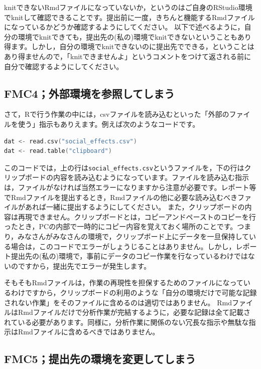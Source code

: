 \documentclass{ltjsbook}
\begin{document}
knitできないRmdファイルになっていないか，というのはご自身のRStudio環境でknitして確認できることです。提出前に一度，きちんと機能するRmdファイルになっているかどうか確認するようにしてください。
以下で述べるように，自分の環境でknitできても，提出先の(私の)環境でknitできないということもあり得ます。しかし，自分の環境でknitできないのに提出先でできる，ということはあり得ませんので，「knitできませんよ」というコメントをつけて返される前に自分で確認するようにしてください。

\subsection{FMC4；外部環境を参照してしまう}

さて，Rで行う作業の中には，csvファイルを読み込むといった「外部のファイルを使う」指示もありえます。例えば次のようなコードです。
\begin{lstlisting}[language=c++,label={code:FAQ01},caption={Rmd中のRコードが外部環境を参照してしまう}]
dat <- read.csv("social_effects.csv")
dat <- read.table("clipboard")
\end{lstlisting}

このコードでは，上の行は\verb|social_effects.csv|というファイルを，下の行はクリップボードの内容を読み込むようになっています。ファイルを読み込む指示は，ファイルがなければ当然エラーになりますから注意が必要です。レポート等でRmdファイルを提出するとき，Rmdファイルの他に必要な読み込むべきファイルがあれば一緒に提出するようにしてください。
また，クリップボードの内容は再現できません。クリップボードとは，コピーアンドペーストのコピーを行ったとき，PCの内部で一時的にコピー内容を覚えておく場所のことです。つまり，みなさんがみなさんの環境で，クリップボード上にデータを一旦保持している場合は，このコードでエラーがしょうじることはありません。しかし，レポート提出先の(私の)環境で，事前にデータのコピー作業を行なっているわけではないのですから，提出先でエラーが発生します。

そもそもRmdファイルは，作業の再現性を担保するためのファイルになっているわけですから，クリップボードの利用のような「自分の環境だけで可能な記録されない作業」をそのファイルに含めるのは適切ではありません。
RmdファイルはRmdファイルだけで分析作業が完結するように，必要な記録は全て記載されている必要があります。同様に，分析作業に関係のない冗長な指示や無駄な指示はRmdファイルに含めるべきではありません。

\subsection{FMC5；提出先の環境を変更してしまう}
\end{document}
